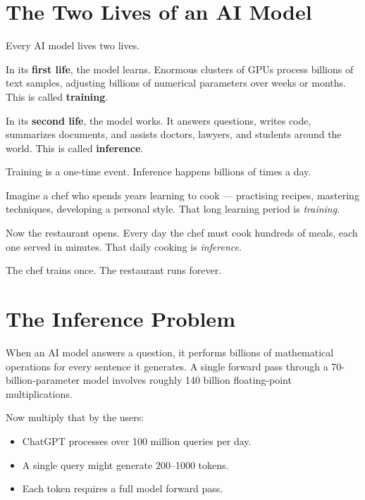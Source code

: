 \documentclass[11pt, twoside, openright]{book}
\newcommand{\analogybox}[2]{\begin{tcolorbox}[analogystyle, title={Analogy: #1}]#2\end{tcolorbox}}
\newcommand{\keyterm}[1]{\textbf{\color{AccentOrange}#1}}
\begin{document}
\section{The Two Lives of an AI Model}

Every AI model lives two lives.

In its \textbf{first life}, the model learns.  Enormous clusters of GPUs process
billions of text samples, adjusting billions of numerical parameters over weeks or
months.  This is called \keyterm{training}.

In its \textbf{second life}, the model works.  It answers questions, writes code,
summarizes documents, and assists doctors, lawyers, and students around the world.
This is called \keyterm{inference}.

Training is a one-time event.  Inference happens billions of times a day.

\analogybox{The Chef and the Restaurant}{
Imagine a chef who spends years learning to cook --- practising recipes, mastering
techniques, developing a personal style.  That long learning period is
\textit{training}.

Now the restaurant opens.  Every day the chef must cook hundreds of meals, each one
served in minutes.  That daily cooking is \textit{inference}.

The chef trains once.  The restaurant runs forever.
}

\section{The Inference Problem}

When an AI model answers a question, it performs billions of mathematical
operations for every sentence it generates.  A single forward pass through a
70-billion-parameter model involves roughly 140 billion floating-point
multiplications.

\bigskip
\noindent Now multiply that by the users:

\begin{itemize}
  \item ChatGPT processes over 100 million queries per day.
  \item A single query might generate 200--1000 tokens.
  \item Each token requires a full model forward pass.
\end{itemize}
\end{document}
